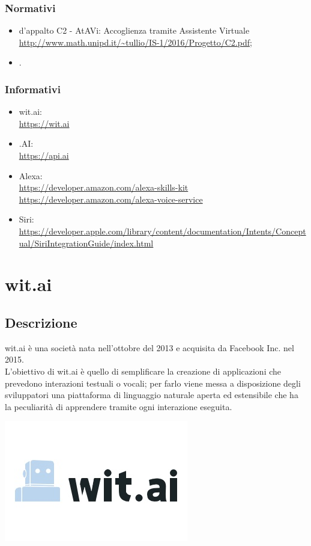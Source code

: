\documentclass[a4paper,titlepage]{article}
\begin{document}
		\subsubsection{Normativi}
			\begin{itemize}
				\item {} d'appalto C2 - AtAVi: Accoglienza tramite Assistente Virtuale \\	\url{http://www.math.unipd.it/~tullio/IS-1/2016/Progetto/C2.pdf};
				\item \NPdoc.
			\end{itemize}
		\subsubsection{Informativi}
			\begin{itemize}
				\item wit.ai: \\
				\url{https://wit.ai}
				\item {}.AI: \\
				\url{https://api.ai}
				\item Alexa: \\
				\url{https://developer.amazon.com/alexa-skills-kit} \\
				\url{https://developer.amazon.com/alexa-voice-service}
				\item Siri: \\
				\url{https://developer.apple.com/library/content/documentation/Intents/Conceptual/SiriIntegrationGuide/index.html}
			\end{itemize}
\newpage
\section{wit.ai}
	\subsection{Descrizione}
		\begin{minipage}{0.7\textwidth}\raggedright
			wit.ai è una società nata nell'ottobre del 2013 e acquisita da Facebook Inc. nel 2015. \\
			L'obiettivo di wit.ai è quello di semplificare la creazione di applicazioni che prevedono interazioni testuali o vocali; per farlo viene messa a disposizione degli sviluppatori una piattaforma di linguaggio naturale aperta ed estensibile che ha la peculiarità di apprendere tramite ogni interazione eseguita.
		\end{minipage}
		\hfill
		\noindent\begin{minipage}{0.15\textwidth}
		\includegraphics[scale=0.6]{images/witai.jpg}
		\end{minipage}
\end{document}
